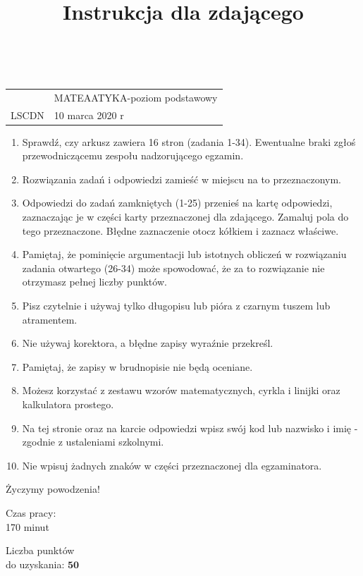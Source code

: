\documentclass[10pt]{article}
\title{Instrukcja dla zdającego }
\author{}
\date{}
\begin{document}
\maketitle
\(\qquad\)

\begin{center}
\begin{tabular}{|l|l}
\hline
 & MATEAATYKA-poziom podstawowy \\
LSCDN & 10 marca 2020 r \\
\hline
\end{tabular}
\end{center}

\begin{enumerate}
  \item Sprawdź, czy arkusz zawiera 16 stron (zadania 1-34). Ewentualne braki zgłoś przewodniczącemu zespołu nadzorującego egzamin.
  \item Rozwiązania zadań i odpowiedzi zamieść w miejscu na to przeznaczonym.
  \item Odpowiedzi do zadań zamkniętych (1-25) przenieś na kartę odpowiedzi, zaznaczając je w części karty przeznaczonej dla zdającego. Zamaluj pola do tego przeznaczone. Błędne zaznaczenie otocz kółkiem i zaznacz właściwe.
  \item Pamiętaj, że pominięcie argumentacji lub istotnych obliczeń w rozwiązaniu zadania otwartego (26-34) może spowodować, że za to rozwiązanie nie otrzymasz pełnej liczby punktów.
  \item Pisz czytelnie i używaj tylko długopisu lub pióra z czarnym tuszem lub atramentem.
  \item Nie używaj korektora, a błędne zapisy wyraźnie przekreśl.
  \item Pamiętaj, że zapisy w brudnopisie nie będą oceniane.
  \item Możesz korzystać z zestawu wzorów matematycznych, cyrkla i linijki oraz kalkulatora prostego.
  \item Na tej stronie oraz na karcie odpowiedzi wpisz swój kod lub nazwisko i imię - zgodnie z ustaleniami szkolnymi.
  \item Nie wpisuj żadnych znaków w części przeznaczonej dla egzaminatora.
\end{enumerate}

Życzymy powodzenia!

Czas pracy:\\
170 minut

Liczba punktów\\
do uzyskania: \(\mathbf{5 0}\)
\end{document}
